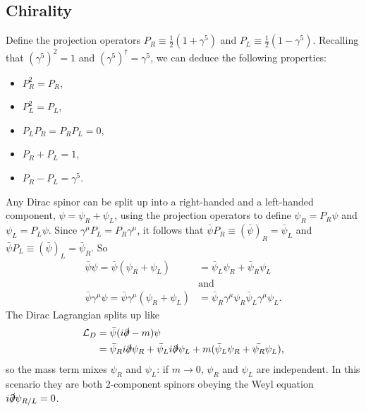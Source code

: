 \documentclass[a4paper,12pt]{article}
\begin{document}
\subsection{Chirality}
%
Define the projection operators $P_R \equiv \frac{1}{2}(1 + \gamma^5)$ and $P_L \equiv \frac{1}{2}(1 - \gamma^5)$. Recalling that $(\gamma^5)^2 = 1$ and $(\gamma^5)^\dagger = \gamma^5$, we can deduce the following properties:
\begin{itemize}
    \item $P_R^2 = P_R$,
    \item $P_L^2 = P_L$,
    \item $P_LP_R = P_RP_L = 0$,
    \item $P_R + P_L = 1$,
    \item $P_R - P_L = \gamma^5$.
\end{itemize}
% 
Any Dirac spinor can be split up into a right-handed and a left-handed component, $\psi = \psi_R + \psi_L$, using the projection operators to define $\psi_R = P_R \psi$ and $\psi_L = P_L \psi$. Since $\gamma^\mu P_L = P_R \gamma^\mu$, it follows that $\bar{\psi} P_R \equiv (\bar{\psi})_R = \bar{\psi}_L$ and $\bar{\psi} P_L \equiv (\bar{\psi})_L = \bar{\psi}_R$. So 
\begin{equation}
\begin{split}
    \bar{\psi}\psi = \bar{\psi}(\psi_R + \psi_L) &= \bar{\psi}_L\psi_R + \bar{\psi}_R\psi_L \\
    &\text{and} \\
    \bar{\psi}\gamma^\mu \psi = \bar{\psi}\gamma^\mu(\psi_R + \psi_L) &= \bar{\psi}_R\gamma^\mu\psi_R 
    \bar{\psi}_L\gamma^\mu\psi_L.
\end{split}
\end{equation}
%
The Dirac Lagrangian splits up like 
\begin{equation}
\begin{split}
\mathcal{L}_D &= \bar{\psi}(i\slashed{\partial}-m)\psi \\ 
&= \bar{\psi}_R i\slashed{\partial}\psi_R + \bar{\psi}_L i\slashed{\partial}\psi_L
+ m(\bar{\psi}_L\psi_R + \bar{\psi_R}\psi_L),
\end{split}
\end{equation}
so the mass term mixes $\psi_R$ and $\psi_L$: if $m \to 0$, $\psi_R$ and $\psi_L$ are independent. In this scenario they are both 2-component spinors obeying the Weyl equation $i\slashed{\partial}\psi_{R/L} = 0$.
\end{document}
